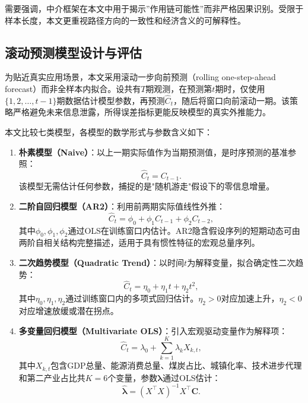 需要强调，中介框架在本文中用于揭示”作用链可能性”而非严格因果识别。受限于样本长度，本文更重视路径方向的一致性和经济含义的可解释性。

\subsection{滚动预测模型设计与评估}
为贴近真实应用场景，本文采用滚动一步向前预测（rolling one-step-ahead forecast）而非全样本内拟合。设共有$T$期观测，在预测第$t$期时，仅使用$\{1,2,\ldots,t-1\}$期数据估计模型参数，再预测$\hat{C}_t$，随后将窗口向前滚动一期。该策略严格避免未来信息泄露，所得误差指标更能反映模型的真实外推能力。

本文比较七类模型，各模型的数学形式与参数含义如下：

\begin{enumerate}

\item {\songti\bfseries{}朴素模型（Naive）}：以上一期实际值作为当期预测值，是时序预测的基准参照：
\begin{equation}
\hat{C}_t = C_{t-1}.
\end{equation}
该模型无需估计任何参数，捕捉的是"随机游走"假设下的零信息增量。

\item {\songti\bfseries{}二阶自回归模型（AR2）}：利用前两期实际值线性外推：
\begin{equation}
\hat{C}_t = \phi_0 + \phi_1 C_{t-1} + \phi_2 C_{t-2},
\end{equation}
其中$\phi_0,\phi_1,\phi_2$通过OLS在训练窗口内估计。AR2隐含假设序列的短期动态可由两阶自相关结构完整描述，适用于具有惯性特征的宏观总量序列。

\item {\songti\bfseries{}二次趋势模型（Quadratic Trend）}：以时间$t$为解释变量，拟合确定性二次趋势：
\begin{equation}
\hat{C}_t = \eta_0 + \eta_1 t + \eta_2 t^2,
\end{equation}
其中$\eta_0,\eta_1,\eta_2$通过训练窗口内的多项式回归估计。$\eta_2>0$对应加速上升，$\eta_2<0$对应增速放缓或潜在拐点。

\item {\songti\bfseries{}多变量回归模型（Multivariate OLS）}：引入宏观驱动变量作为解释项：
\begin{equation}
\hat{C}_t = \lambda_0 + \sum_{k=1}^{K} \lambda_k X_{k,t},
\end{equation}
其中$X_{k,t}$包含GDP总量、能源消费总量、煤炭占比、城镇化率、技术进步代理和第二产业占比共$K=6$个变量，参数$\boldsymbol{\lambda}$通过OLS估计：
\begin{equation}
\hat{\boldsymbol{\lambda}} = (X^\top X)^{-1}X^\top \mathbf{C}.
\end{equation}


\end{enumerate}
